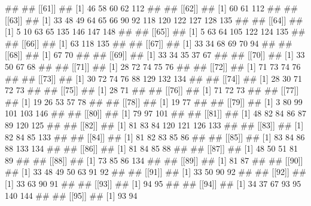 \documentclass[11pt,]{article}
\newenvironment{Shaded}{\begin{snugshade}}{\end{snugshade}}
\newcommand{\NormalTok}[1]{#1}
\begin{document}
\begin{Shaded}
\begin{Highlighting}[]
\NormalTok{## }
\NormalTok{## [[61]]}
\NormalTok{## [1]  46  58  60  62 112}
\NormalTok{## }
\NormalTok{## [[62]]}
\NormalTok{## [1]  60  61 112}
\NormalTok{## }
\NormalTok{## [[63]]}
\NormalTok{##  [1]  33  48  49  64  65  66  90  92 118 120 122 127 128 135}
\NormalTok{## }
\NormalTok{## [[64]]}
\NormalTok{## [1]   5  10  63  65 135 146 147 148}
\NormalTok{## }
\NormalTok{## [[65]]}
\NormalTok{## [1]   5  63  64 105 122 124 135}
\NormalTok{## }
\NormalTok{## [[66]]}
\NormalTok{## [1]  63 118 135}
\NormalTok{## }
\NormalTok{## [[67]]}
\NormalTok{## [1] 33 34 68 69 70 94}
\NormalTok{## }
\NormalTok{## [[68]]}
\NormalTok{## [1] 67 70}
\NormalTok{## }
\NormalTok{## [[69]]}
\NormalTok{## [1] 33 34 35 37 67}
\NormalTok{## }
\NormalTok{## [[70]]}
\NormalTok{## [1] 33 50 67 68}
\NormalTok{## }
\NormalTok{## [[71]]}
\NormalTok{## [1] 28 72 74 75 76}
\NormalTok{## }
\NormalTok{## [[72]]}
\NormalTok{## [1] 71 73 74 76}
\NormalTok{## }
\NormalTok{## [[73]]}
\NormalTok{## [1]  30  72  74  76  88 129 132 134}
\NormalTok{## }
\NormalTok{## [[74]]}
\NormalTok{## [1] 28 30 71 72 73}
\NormalTok{## }
\NormalTok{## [[75]]}
\NormalTok{## [1] 28 71}
\NormalTok{## }
\NormalTok{## [[76]]}
\NormalTok{## [1] 71 72 73}
\NormalTok{## }
\NormalTok{## [[77]]}
\NormalTok{## [1] 19 26 53 57 78}
\NormalTok{## }
\NormalTok{## [[78]]}
\NormalTok{## [1] 19 77}
\NormalTok{## }
\NormalTok{## [[79]]}
\NormalTok{## [1]   3  80  99 101 103 146}
\NormalTok{## }
\NormalTok{## [[80]]}
\NormalTok{## [1]  79  97 101}
\NormalTok{## }
\NormalTok{## [[81]]}
\NormalTok{## [1]  48  82  84  86  87  89 120 125}
\NormalTok{## }
\NormalTok{## [[82]]}
\NormalTok{## [1]  81  83  84 120 121 126 133}
\NormalTok{## }
\NormalTok{## [[83]]}
\NormalTok{## [1]  82  84  85 133}
\NormalTok{## }
\NormalTok{## [[84]]}
\NormalTok{## [1] 81 82 83 85 86}
\NormalTok{## }
\NormalTok{## [[85]]}
\NormalTok{## [1]  83  84  86  88 133 134}
\NormalTok{## }
\NormalTok{## [[86]]}
\NormalTok{## [1] 81 84 85 88}
\NormalTok{## }
\NormalTok{## [[87]]}
\NormalTok{## [1] 48 50 51 81 89}
\NormalTok{## }
\NormalTok{## [[88]]}
\NormalTok{## [1]  73  85  86 134}
\NormalTok{## }
\NormalTok{## [[89]]}
\NormalTok{## [1] 81 87}
\NormalTok{## }
\NormalTok{## [[90]]}
\NormalTok{## [1] 33 48 49 50 63 91 92}
\NormalTok{## }
\NormalTok{## [[91]]}
\NormalTok{## [1] 33 50 90 92}
\NormalTok{## }
\NormalTok{## [[92]]}
\NormalTok{## [1] 33 63 90 91}
\NormalTok{## }
\NormalTok{## [[93]]}
\NormalTok{## [1] 94 95}
\NormalTok{## }
\NormalTok{## [[94]]}
\NormalTok{## [1]  34  37  67  93  95 140 144}
\NormalTok{## }
\NormalTok{## [[95]]}
\NormalTok{## [1] 93 94}

\end{Highlighting}
\end{Shaded}
\end{document}
